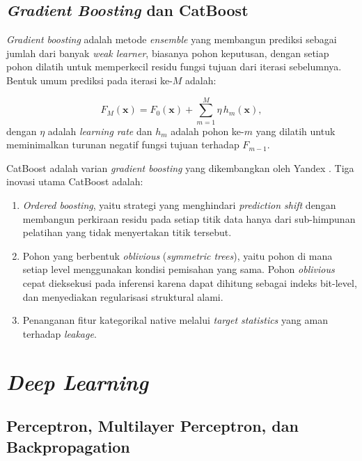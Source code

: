 \subsection{\textit{Gradient Boosting} dan CatBoost}

\textit{Gradient boosting} adalah metode \textit{ensemble} yang membangun prediksi sebagai jumlah dari banyak \textit{weak learner}, biasanya pohon keputusan, dengan setiap pohon dilatih untuk memperkecil residu fungsi tujuan dari iterasi sebelumnya. Bentuk umum prediksi pada iterasi ke-$M$ adalah:

\begin{equation}
    F_M(\mathbf{x}) = F_0(\mathbf{x}) + \sum_{m=1}^{M} \eta \, h_m(\mathbf{x}),
    \label{eq:gbm}
\end{equation}
dengan $\eta$ adalah \textit{learning rate} dan $h_m$ adalah pohon ke-$m$ yang dilatih untuk meminimalkan turunan negatif fungsi tujuan terhadap $F_{m-1}$.

CatBoost adalah varian \textit{gradient boosting} yang dikembangkan oleh Yandex \citep{prokhorenkovaCatBoost2018}. Tiga inovasi utama CatBoost adalah:

\begin{enumerate}
    \item \textit{Ordered boosting}, yaitu strategi yang menghindari \textit{prediction shift} dengan membangun perkiraan residu pada setiap titik data hanya dari sub-himpunan pelatihan yang tidak menyertakan titik tersebut.
    \item Pohon yang berbentuk \textit{oblivious} (\textit{symmetric trees}), yaitu pohon di mana setiap level menggunakan kondisi pemisahan yang sama. Pohon \textit{oblivious} cepat dieksekusi pada inferensi karena dapat dihitung sebagai indeks bit-level, dan menyediakan regularisasi struktural alami.
    \item Penanganan fitur kategorikal native melalui \textit{target statistics} yang aman terhadap \textit{leakage}.
\end{enumerate}

\section{\textit{Deep Learning}}
\label{sec:dl}

\subsection{Perceptron, Multilayer Perceptron, dan Backpropagation}

